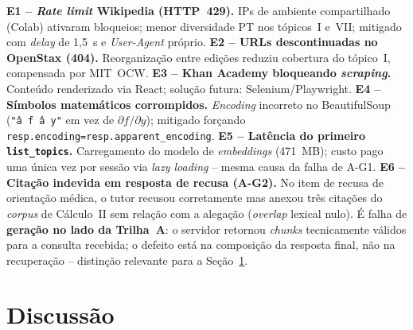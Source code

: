 \documentclass[12pt]{article}
\begin{document}
\textbf{E1 -- \textit{Rate limit} Wikipedia (HTTP~429).} IPs de ambiente compartilhado (Colab)
ativaram bloqueios; menor diversidade PT nos tópicos~I e~VII; mitigado com \textit{delay} de
1,5~s e \textit{User-Agent} próprio.
\textbf{E2 -- URLs descontinuadas no OpenStax (404).} Reorganização entre edições reduziu
cobertura do tópico~I, compensada por MIT~OCW.
\textbf{E3 -- Khan Academy bloqueando \textit{scraping}.} Conteúdo renderizado via React;
solução futura: Selenium/Playwright.
\textbf{E4 -- Símbolos matemáticos corrompidos.} \textit{Encoding} incorreto no BeautifulSoup
(\texttt{"â f â y"} em vez de $\partial f/\partial y$); mitigado forçando
\texttt{resp.encoding=resp.apparent\_encoding}.
\textbf{E5 -- Latência do primeiro \texttt{list\_topics}.} Carregamento do modelo de
\textit{embeddings} (471~MB); custo pago uma única vez por sessão via \textit{lazy loading} --
mesma causa da falha de A-G1.
\textbf{E6 -- Citação indevida em resposta de recusa (A-G2).} No item de recusa de orientação
médica, o tutor recusou corretamente mas anexou três citações do \textit{corpus} de Cálculo~II sem
relação com a alegação (\textit{overlap} lexical nulo). É falha de \textbf{geração no lado da
Trilha~A}: o servidor retornou \textit{chunks} tecnicamente válidos para a consulta recebida; o
defeito está na composição da resposta final, não na recuperação -- distinção relevante para a
Seção~\ref{sec:discussao}.

\section{Discussão}
\label{sec:discussao}
\end{document}
